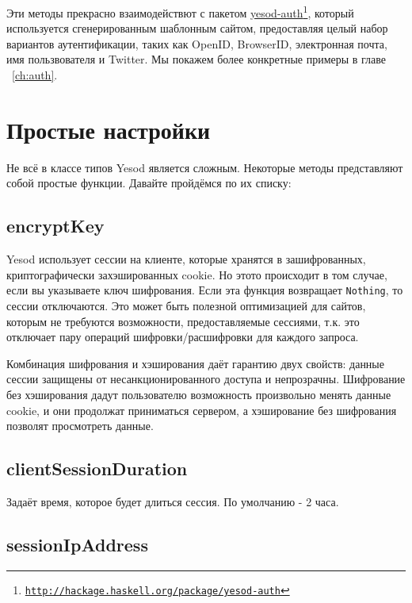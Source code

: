Эти методы прекрасно взаимодействют с пакетом \href{http://hackage.haskell.org/package/yesod-auth}{yesod-auth}\footnote{\href{http://hackage.haskell.org/package/yesod-auth}{\texttt{http://hackage.haskell.org/package/yesod-auth}}}, который используется сгенерированным шаблонным сайтом, предоставляя целый набор вариантов аутентификации, таких как OpenID, BrowserID, электронная почта, имя пользвователя и Twitter. Мы покажем более конкретные примеры в главе ~\ref{ch:auth}.

\section {Простые настройки}

Не всё в классе типов Yesod является сложным. Некоторые методы представляют собой простые функции. Давайте пройдёмся по их списку:

\subsection {encryptKey}

Yesod использует сессии на клиенте, которые хранятся в зашифрованных, криптографически захэшированных cookie. Но этото происходит в том случае, если вы указываете ключ шифрования. Если эта функция возвращает \lstinline!Nothing!, то сессии отключаются. Это может быть полезной оптимизацией для сайтов, которым не требуются возможности, предоставляемые сессиями, т.к. это отключает пару операций шифровки/расшифровки для каждого запроса.

\begin{remark}
Комбинация шифрования и хэширования даёт гарантию двух свойств: данные сессии защищены от несанкционированного доступа и непрозрачны. Шифрование без хэширования дадут пользователю возможность произвольно менять данные cookie, и они продолжат приниматься сервером, а хэширование без шифрования позволят просмотреть данные.
\end{remark}

\subsection {clientSessionDuration}

Задаёт время, которое будет длиться сессия. По умолчанию - 2 часа.

\subsection {sessionIpAddress}

